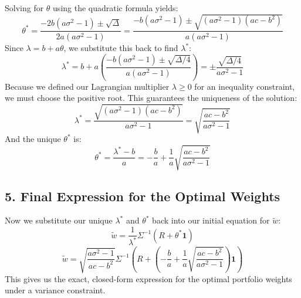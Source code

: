 Solving for $\theta$ using the quadratic formula yields:
$$\theta^* = \frac{-2b(a\sigma^2 - 1) \pm \sqrt{\Delta}}{2a(a\sigma^2 - 1)} = \frac{-b(a\sigma^2 - 1) \pm \sqrt{(a\sigma^2 - 1)(ac - b^2)}}{a(a\sigma^2 - 1)}$$
Since $\lambda = b + a\theta$, we substitute this back to find $\lambda^*$:
$$\lambda^* = b + a \left( \frac{-b(a\sigma^2 - 1) \pm \sqrt{\Delta/4}}{a(a\sigma^2 - 1)} \right) = \pm \frac{\sqrt{\Delta/4}}{a\sigma^2 - 1}$$
Because we defined our Lagrangian multiplier $\lambda \ge 0$ for an inequality constraint, we must choose the positive root. This guarantees the uniqueness of the solution:
$$\lambda^* = \frac{\sqrt{(a\sigma^2 - 1)(ac - b^2)}}{a\sigma^2 - 1} = \sqrt{\frac{ac - b^2}{a\sigma^2 - 1}}$$
And the unique $\theta^*$ is:
$$\theta^* = \frac{\lambda^* - b}{a} = -\frac{b}{a} + \frac{1}{a}\sqrt{\frac{ac - b^2}{a\sigma^2 - 1}}$$

\subsection*{5. Final Expression for the Optimal Weights}
Now we substitute our unique $\lambda^*$ and $\theta^*$ back into our initial equation for $\tilde{w}$:
$$\tilde{w} = \frac{1}{\lambda^*} \Sigma^{-1} (R + \theta^* \mathbf{1})$$
$$\tilde{w} = \sqrt{\frac{a\sigma^2 - 1}{ac - b^2}} \Sigma^{-1} \left( R + \left( -\frac{b}{a} + \frac{1}{a}\sqrt{\frac{ac - b^2}{a\sigma^2 - 1}} \right) \mathbf{1} \right)$$
This gives us the exact, closed-form expression for the optimal portfolio weights under a variance constraint.